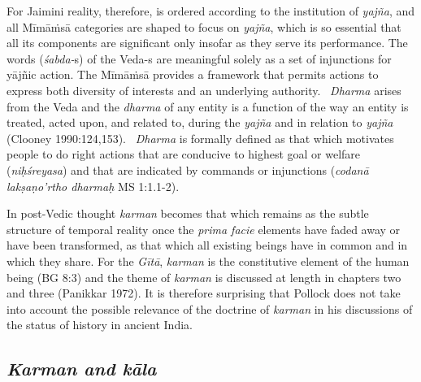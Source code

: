 For Jaimini reality, therefore, is ordered according to the institution of \textit{yajña}, and all Mīmāṁsā categories are shaped to focus on \textit{yajña}, which is so essential that all its components are significant only insofar as they serve its performance. The words (\textit{śabda-}s) of the Veda-s are meaningful solely as a set of injunctions for yājñic action. The Mīmāṁsā provides a framework that permits actions to express both diversity of interests and an underlying authority.  \textit{Dharma} arises from the Veda and the \textit{dharma} of any entity is a function of the way an entity is treated, acted upon, and related to, during the \textit{yajña} and in relation to \textit{yajña} (Clooney 1990:124,153).  \textit{Dharma} is formally defined as that which motivates people to do right actions that are conducive to highest goal or welfare (\textit{niḥśreyasa}) and that are indicated by commands or injunctions (\textit{codanā lakṣaṇo'rtho dharmaḥ} MS 1:1.1-2).

In post-Vedic thought \textit{karman} becomes that which remains as the subtle structure of temporal reality once the \textit{prima facie} elements have faded away or have been transformed, as that which all existing beings have in common and in which they share. For the \textit{Gītā}, \textit{karman} is the constitutive element of the human being (BG 8:3) and the theme of \textit{karman} is discussed at length in chapters two and three (Panikkar 1972). It is therefore surprising that Pollock does not take into account the possible relevance of the doctrine of \textit{karman} in his discussions of the status of history in ancient India.


\subsection*{\textit{Karman and kāla}}

